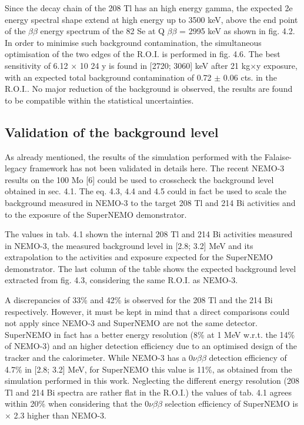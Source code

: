 \documentclass[main.tex]{subfiles}
\begin{document}
\bigskip

\NI Since the decay chain of the 208 Tl has an high energy gamma, the expected 2e energy spectral shape extend at high energy up to 3500 keV, above the end point of the $\beta\beta$ energy spectrum of the 82 Se at Q $\beta\beta$ = 2995 keV as shown in fig. 4.2. In order to minimise such background contamination, the simultaneous optimisation of the two edges of the R.O.I. is performed in fig. 4.6. The best sensitivity of 6.12 $\times$ 10 24 y is found in [2720; 3060] keV after 21 kg$\times$y exposure, with an expected total background contamination of 0.72 $\pm$ 0.06 cts. in the R.O.I.. No major reduction of the background is observed, the results are found to be compatible within the statistical uncertainties.


\subsection{Validation of the background level}


\NI As already mentioned, the results of the simulation performed with the Falaise-legacy framework has not been validated in details here. The recent NEMO-3 results on the 100 Mo [6] could be used to crosscheck the background level obtained in sec. 4.1. The eq. 4.3, 4.4 and 4.5 could in fact be used to scale the background measured in NEMO-3 to the target 208 Tl and 214 Bi activities and to the exposure of the SuperNEMO demonstrator.


\bigskip


\NI The values in tab. 4.1 shown the internal 208 Tl and 214 Bi activities measured in NEMO-3, the measured background level in [2.8; 3.2] MeV and its extrapolation to the activities and exposure expected for the SuperNEMO demonstrator. The last column of the table shows the expected background level extracted from fig. 4.3, considering the same R.O.I. as NEMO-3. 


\bigskip


\NI A discrepancies of 33\% and 42\% is observed for the 208 Tl and the 214 Bi respectively. However, it must be kept in mind that a direct comparisons could not apply since NEMO-3 and SuperNEMO are not the same detector. SuperNEMO in fact has a better energy resolution (8\% at 1 MeV w.r.t. the 14\% of NEMO-3) and an higher detection efficiency due to an optimised design of the tracker and the calorimeter. While NEMO-3 has a 0$\nu\beta\beta$ detection efficiency of 4.7\% in [2.8; 3.2] MeV, for SuperNEMO this value is 11\%, as obtained from the simulation performed in this work. Neglecting the different energy resolution (208 Tl and 214 Bi spectra are rather flat in the R.O.I.) the values of tab. 4.1 agrees within 20\% when considering that the 0$\nu\beta\beta$ selection efficiency of SuperNEMO is $\times$ 2.3 higher than NEMO-3.
\end{document}
